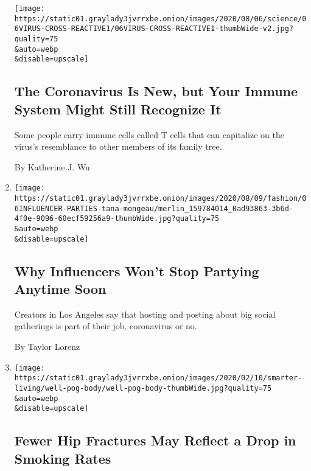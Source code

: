 \begin{enumerate}
  \texttt{[image: https://static01.graylady3jvrrxbe.onion/images/2020/08/06/science/06VIRUS-CROSS-REACTIVE1/06VIRUS-CROSS-REACTIVE1-thumbWide-v2.jpg?quality=75\\\&auto=webp\\\&disable=upscale]}

  \hypertarget{the-coronavirus-is-new-but-your-immune-system-might-still-recognize-it}{%
  \subsection{The Coronavirus Is New, but Your Immune System Might Still
  Recognize
  It}\label{the-coronavirus-is-new-but-your-immune-system-might-still-recognize-it}}

  Some people carry immune cells called T cells that can capitalize on
  the virus's resemblance to other members of its family tree.

  By Katherine J. Wu
\item
  \href{/2020/08/06/style/influencer-parties-jake-paul-tana-mongeau-thomas-petrou-hype-house.html}{}

  \texttt{[image: https://static01.graylady3jvrrxbe.onion/images/2020/08/09/fashion/06INFLUENCER-PARTIES-tana-mongeau/merlin\_159784014\_0ad93863-3b6d-4f0e-9096-60ecf59256a9-thumbWide.jpg?quality=75\\\&auto=webp\\\&disable=upscale]}

  \hypertarget{why-influencers-wont-stop-partying-anytime-soon}{%
  \subsection{Why Influencers Won't Stop Partying Anytime
  Soon}\label{why-influencers-wont-stop-partying-anytime-soon}}

  Creators in Los Angeles say that hosting and posting about big social
  gatherings is part of their job, coronavirus or no.

  By Taylor Lorenz
\item
  \href{/2020/08/06/well/live/fewer-hip-fractures-may-reflect-a-drop-in-smoking-rates.html}{}

  \texttt{[image: https://static01.graylady3jvrrxbe.onion/images/2020/02/10/smarter-living/well-pog-body/well-pog-body-thumbWide.jpg?quality=75\\\&auto=webp\\\&disable=upscale]}

  \hypertarget{fewer-hip-fractures-may-reflect-a-drop-in-smoking-rates}{%
  \subsection{Fewer Hip Fractures May Reflect a Drop in Smoking
  Rates}\label{fewer-hip-fractures-may-reflect-a-drop-in-smoking-rates}}


\end{enumerate}
